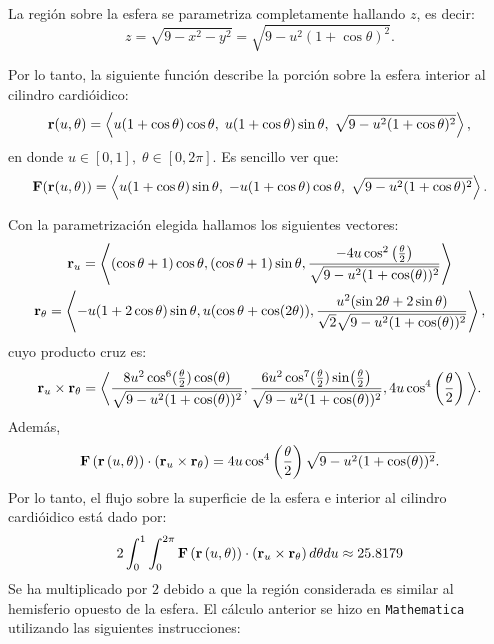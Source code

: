 \begin{parrafonumerado}
La región sobre la esfera se parametriza completamente hallando $z$, es decir:
\[
z = \sqrt{9 - x^2 - y^2} = \sqrt{9 - u^2(1 + \cos \theta)^2}.
\]

Por lo tanto, la siguiente función describe la porción sobre la esfera interior al cilindro cardióidico:
\[
{\bf r}(u,\theta) =
\left\langle
u(1 + \cos \theta) \cos \theta,\;
u(1 + \cos \theta) \sin \theta,\;
\sqrt{9 - u^2(1 + \cos \theta)^2}
\right\rangle,
\]
en donde $u \in [0,1],\; \theta \in [0,2\pi]$. Es sencillo ver que:
\begin{gather*}
{\bf F}({\bf r}(u,\theta)) =
\left\langle
u(1 + \cos \theta) \sin \theta,\;
- u(1 + \cos \theta) \cos \theta,\;
\sqrt{9 - u^2(1 + \cos \theta)^2}
\right\rangle.
\end{gather*}

Con la parametrización elegida hallamos los siguientes vectores:
\begin{gather*}
{\bf r}_{u} = \left \langle (\cos \theta +1) \cos \theta ,\left(\cos \theta +1\right) \sin \theta ,\frac{-4u\cos^2\left( \frac{\theta}{2} \right)}{\sqrt{9-u^2(1+\cos(\theta))^2}}\right\rangle \\
{\bf r}_{\theta}=\left\langle -u( 1+2\cos \theta)\sin \theta ,u(\cos \theta +\cos (2\theta)),\frac{u^{2}(\sin 2\theta+2\sin \theta)}{\sqrt{2}\sqrt{9-u^2(1+\cos(\theta))^2}} \right\rangle,
\end{gather*}
cuyo producto cruz es:
\begin{gather*}
{\bf r}_{u}\times {\bf r}_{\theta}= \bigg \langle \frac{8u^2\cos^6(\frac{\theta}{2})\cos(\theta)}{\sqrt{9-u^2(1+\cos(\theta))^2}}, \frac{6u^2\cos^7(\frac{\theta}{2})\sin(\frac{\theta}{2})}{\sqrt{9-u^2(1+\cos(\theta))^2}},4u\cos^4\left(\frac{\theta}{2}\right )\bigg \rangle.
\end{gather*}
Además,
\[{\bf F}\left({\bf r}\left( u,\theta \right) \right) \cdot \left({\bf r}_{u}\times {\bf r}_{\theta}\right) =
4u \cos^4\left(\frac{\theta}{2}\right)\sqrt{9-u^2(1+\cos(\theta))^2}.\]
Por lo tanto, el flujo sobre la superficie de la esfera e interior al cilindro cardióidico está dado por:
\begin{equation}\label{flujo7}
2\int_{0}^{1}\int_{0}^{2\pi}{\bf F}\left({\bf r}\left( u,\theta \right) \right) \cdot \left({\bf r}_{u}\times {\bf r}_{\theta}\right) d\theta du\approx 25.8179
\end{equation}
Se ha multiplicado por $2$ debido a que la región considerada es similar al hemisferio opuesto de la esfera.
El cálculo anterior se hizo en \verb"Mathematica" utilizando las siguientes instrucciones:


\end{parrafonumerado}
